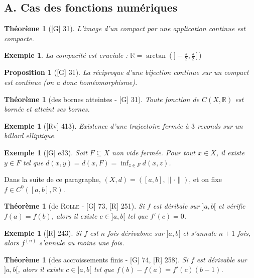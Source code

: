 \documentclass[10pt, a4paper, parskip=full, twoside, twocolumn]{report}
\newtheorem{theorem}[definition]{Théorème}
\newtheorem{proposition}[definition]{Proposition}
\newtheorem{example}[definition]{Exemple}
\newcommand{\IR}{\mathbb{R}}
\begin{document}
\subsection*{A. Cas des fonctions numériques}

\begin{theorem}[\textnormal{[G] 31}]
	L'image d'un compact par une application continue est compacte.
\end{theorem}

\begin{example}
	La compacité est cruciale : $\IR = \arctan\left(]-\frac{\pi}{2},\frac{\pi}{2}[\right)$
\end{example}

\begin{proposition}[\textnormal{[G] 31}]
	La réciproque d'une bijection continue sur un compact est continue (on a donc homéomorphisme).
\end{proposition}

\begin{theorem}[des bornes atteintes - \textnormal{[G] 31}]
	Toute fonction de $C(X,\IR)$ est bornée et atteint ses bornes.
\end{theorem}

\begin{example}[\textnormal{[Rv] 413}]
	Existence d'une trajectoire fermée à $3$ revonds sur un billard elliptique.
\end{example}

\begin{example}[\textnormal{[G] e33}]
	Soit $F\subseteq X$ non vide fermée. Pour tout $x\in X$, il existe $y\in F$ tel que $d(x,y)=d(x,F)=\inf_{z\in F} d(x,z)$.
\end{example}

\textcolor{paragraphtext}{Dans la suite de ce paragraphe, $(X,d) = ([a,b], \|\cdot\|)$, et on fixe $f\in C^0([a,b], \IR)$.}

\begin{theorem}[de \textsc{Rolle} - \textnormal{[G] 73, [R] 251}]
	Si $f$ est déribale sur $]a,b[$ et vérifie $f(a)=f(b)$, alors il existe $c\in ]a,b[$ tel que $f'(c)=0$.
\end{theorem}

\begin{example}[\textnormal{[R] 243}]
	Si $f$ est $n$ fois dérivabme sur $]a,b[$ et s'annule $n+1$ fois, alors $f^{(n)}$ s'annule au moins une fois.
\end{example}

\begin{theorem}[des accroissements finis - \textnormal{[G] 74, [R] 258}]
	Si $f$ est dérivable sur $]a,b[$, alors il existe $c\in ]a,b[$ tel que $f(b)-f(a) = f'(c)(b-1)$.
\end{theorem}
\end{document}
